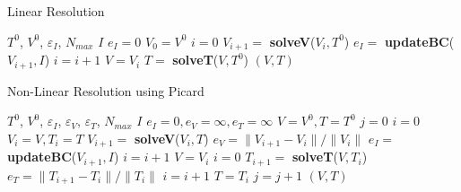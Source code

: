 \begin{algorithm}[H]
  \caption{Linear Resolution}
  \label{algo:et-linear}
  \begin{algorithmic}
    \REQUIRE $T^0$, $V^0$, $\varepsilon_I$, $N_{max}$
    \ENSURE $I$
    \STATE $e_I=0$
    \STATE $V_0=V^0$
    \STATE $i=0$
    \vspace{0.3cm}
    \REPEAT
      \STATE $V_{i+1} =$ \textbf{solveV}($V_i,T^0$)
        \STATE $e_I =$ \textbf{updateBC}($V_{i+1},I$)
      \ENDIF
      \STATE $i = i+1$
    \STATE $V=V_i$
    \STATE $T =$ \textbf{solveT}($V,T^0$)
    \RETURN $(V,T)$
  \end{algorithmic}
\end{algorithm}

\begin{algorithm}[H]
  \caption{Non-Linear Resolution using Picard}
  \label{algo:et-picard}
  \begin{algorithmic}
    \REQUIRE $T^0$, $V^0$, $\varepsilon_I$, $\varepsilon_V$, $\varepsilon_T$,
    $N_{max}$
    \ENSURE $I$
    \STATE $e_I=0, e_V=\infty, e_T=\infty$
    \STATE $V=V^0,T=T^0$
    \STATE $j=0$
    \vspace{0.3cm}
    \REPEAT
      \STATE $i=0$
      \STATE $V_i=V,T_i=T$
      \REPEAT
        \STATE $V_{i+1} =$ \textbf{solveV}($V_i,T$)
        \STATE $e_V = \parallel V_{i+1}-V_i\parallel / \parallel V_i\parallel$
          \STATE $e_I =$ \textbf{updateBC}($V_{i+1},I$)
        \ENDIF
        \STATE $i = i+1$
      \STATE $V=V_i$
      \STATE $i=0$
      \REPEAT
        \STATE $T_{i+1} =$ \textbf{solveT}($V,T_i$)
        \STATE $e_T = \parallel T_{i+1}-T_i\parallel / \parallel T_i\parallel$
        \STATE $i=i+1$
      \STATE $T=T_i$
      \STATE $j=j+1$
    \RETURN $(V,T)$
  \end{algorithmic}
\end{algorithm}

